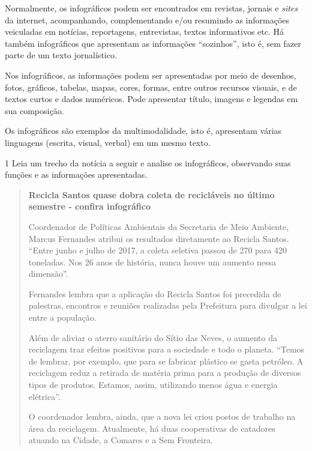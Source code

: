 \begin{escolha}
\begin{escolha}
{{Normalmente, os infográficos podem ser encontrados em revistas, jornais
e \emph{sites} da internet, acompanhando, complementando e/ou resumindo
as informações veiculadas em notícias, reportagens, entrevistas, textos
informativos etc. Há também infográficos que apresentam as informações
``sozinhos'', isto é, sem fazer parte de um texto jornalístico.

Nos infográficos, as informações podem ser apresentadas por meio de
desenhos, fotos, gráficos, tabelas, mapas, cores, formas, entre outros
recursos visuais, e de textos curtos e dados numéricos. Pode apresentar
título, imagens e legendas em sua composição.

Os infográficos são exemplos da multimodalidade, isto é, apresentam
várias linguagens (escrita, visual, verbal) em um mesmo texto.
}



\num{1} Leia um trecho da notícia a seguir e analise os infográficos, observando
suas funções e as informações apresentadas.

\begin{quote}
\textbf{Recicla Santos quase dobra coleta de recicláveis no último
semestre - confira infográfico}


Coordenador de Políticas Ambientais da Secretaria de Meio Ambiente,
Marcus Fernandes atribui os resultados diretamente ao Recicla Santos.
``Entre junho e julho de 2017, a coleta seletiva passou de 270 para 420
toneladas. Nos 26 anos de história, nunca houve um aumento nessa
dimensão''.

Fernandes lembra que a aplicação do Recicla Santos foi precedida de
palestras, encontros e reuniões realizadas pela Prefeitura para divulgar
a lei entre a população.

Além de aliviar o aterro sanitário do Sítio das Neves, o aumento da
reciclagem traz efeitos positivos para a sociedade e todo o planeta.
``Temos de lembrar, por exemplo, que para se fabricar plástico se gasta
petróleo. A reciclagem reduz a retirada de matéria prima para a produção
de diversos tipos de produtos. Estamos, assim, utilizando menos água e
energia elétrica''.

O coordenador lembra, ainda, que a nova lei criou postos de trabalho na
área da reciclagem. Atualmente, há duas cooperativas de catadores
atuando na Cidade, a Comares e a Sem Fronteira.


\end{quote}}
\end{escolha}
\end{escolha}
